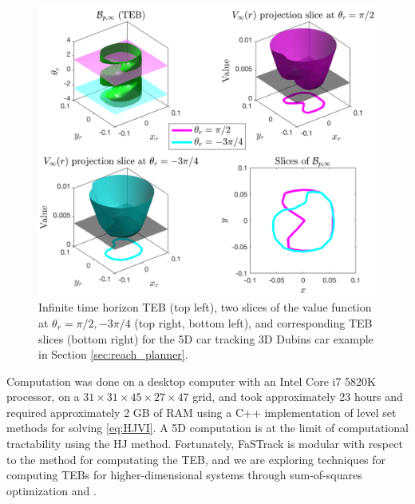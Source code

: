 \begin{figure}
	\includegraphics[width=\columnwidth]{fig/ti_valfunc_5d3d}
	\caption{Infinite time horizon TEB (top left), two slices of the value function at $\theta_r = \pi/2, -3\pi/4$ (top right, bottom left), and corresponding TEB slices (bottom right) for the 5D car tracking 3D Dubins car example in Section \ref{sec:reach_planner}.}
	\label{fig:vf_TEB:5D3D}  
\end{figure}

Computation was done on a desktop computer with an Intel Core i7 5820K processor, on a $31\times31\times45\times27\times47$ grid, and took approximately 23 hours and required approximately 2 GB of RAM using a C++ implementation of level set methods for solving \eqref{eq:HJVI}. 
A 5D computation is at the limit of computational tractability using the HJ method.
Fortunately, FaSTrack is modular with respect to the method for computating the TEB, and we are exploring techniques for computing TEBs for higher-dimensional systems through sum-of-squares optimization \cite{SinghChenEtAl2018} and .



